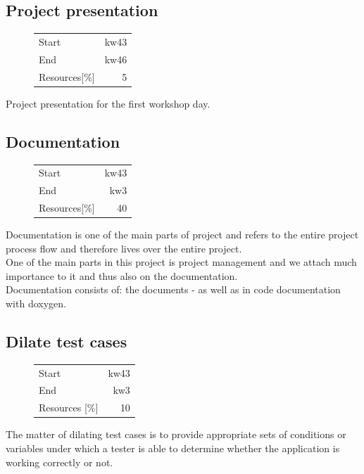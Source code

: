 \subsection{Project presentation}
\begin{figure}
\begin{tabular}[t]{|lr|}
\hline
Start & kw43\\
End & kw46\\
Resources[\%] & 5\\
\hline
\end{tabular}
\end{figure}
Project presentation for the first workshop day.


\subsection{Documentation}
\begin{figure}
\begin{tabular}[t]{|lr|}
\hline
Start & kw43\\
End & kw3\\
Resources[\%] & 40\\
\hline
\end{tabular}
\end{figure}
Documentation is one of the main parts of project and refers to the entire project 
process flow and therefore lives over the entire project.\\
One of the main parts in this project is project management and we attach much 
importance to it and thus also on the documentation.\\

Documentation consists of: the documents \cite [NESD1]{NESD1} - \cite [NESD5]{NESD5} 
as well as in code documentation with doxygen.

\subsection{Dilate test cases}
\begin{figure}
\begin{tabular}[t]{|lr|}
\hline
Start & kw43\\
End & kw3\\
Resources [\%] & 10\\
\hline
\end{tabular}
\end{figure}
The matter of dilating test cases is to provide appropriate sets of conditions or variables under which
a tester is able to determine whether the application is working correctly or not.

